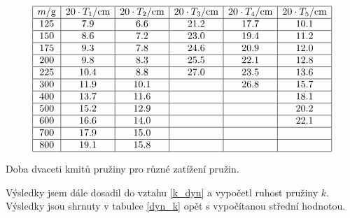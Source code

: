 \documentclass[a4paper,12pt]{article}
\begin{document}
\begin{table}
$$
\begin{array}{|c|c|c|c|c|c|}
\hline
m/\mbox{g}&	20\cdot T_1/\mbox{cm}&	20\cdot T_2/\mbox{cm}&	20\cdot T_3/\mbox{cm}&	20\cdot T_4/\mbox{cm}&	20\cdot T_5/\mbox{cm}	\\ \hline	
125&	7.9&	6.6&	21.2&	17.7&	10.1	\\ \hline
150&	8.6&	7.2&	23.0&	19.4&	11.2	\\ \hline
175&	9.3&	7.8&	24.6&	20.9&	12.0	\\ \hline
200&	9.8&	8.3&	25.5&	22.1&	12.8	\\ \hline
225&	10.4&	8.8&	27.0&	23.5&	13.6	\\ \hline
300&	11.9&	10.1&	&	26.8&	15.7	\\ \hline
400&	13.7&	11.6&	&	&	18.1	\\ \hline
500&	15.2&	12.9&	&	&	20.2	\\ \hline
600&	16.6&	14.0&	&	&	22.1	\\ \hline
700&	17.9&	15.0&	&	&		\\ \hline
800&	19.1&	15.8&	&	&		\\ \hline
\end{array}
$$
\caption{Doba dvaceti kmitů pružiny pro různé zatížení pružin.}
\label{dyn_T}
\end{table}

Výsledky jsem dále dosadil do vztahu \ref{k_dyn} a vypočetl ruhost pružiny $k$. Výsledky jsou shrnuty v tabulce \ref{dyn_k} 
opět s vypočítanou střední hodnotou.
\end{document}
